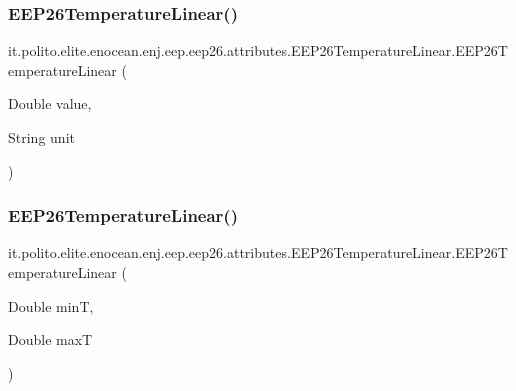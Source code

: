 \subsubsection{\texorpdfstring{E\+E\+P26\+Temperature\+Linear()}{EEP26TemperatureLinear()}\hspace{0.1cm}{\footnotesize\ttfamily [2/3]}}
{\footnotesize\ttfamily it.\+polito.\+elite.\+enocean.\+enj.\+eep.\+eep26.\+attributes.\+E\+E\+P26\+Temperature\+Linear.\+E\+E\+P26\+Temperature\+Linear (\begin{DoxyParamCaption}\item[{Double}]{value,  }\item[{String}]{unit }\end{DoxyParamCaption})}

\hypertarget{classit_1_1polito_1_1elite_1_1enocean_1_1enj_1_1eep_1_1eep26_1_1attributes_1_1_e_e_p26_temperature_linear_adf34ac904b3745354e5a1cd247f47696}{}\label{classit_1_1polito_1_1elite_1_1enocean_1_1enj_1_1eep_1_1eep26_1_1attributes_1_1_e_e_p26_temperature_linear_adf34ac904b3745354e5a1cd247f47696} 
\subsubsection{\texorpdfstring{E\+E\+P26\+Temperature\+Linear()}{EEP26TemperatureLinear()}\hspace{0.1cm}{\footnotesize\ttfamily [3/3]}}
{\footnotesize\ttfamily it.\+polito.\+elite.\+enocean.\+enj.\+eep.\+eep26.\+attributes.\+E\+E\+P26\+Temperature\+Linear.\+E\+E\+P26\+Temperature\+Linear (\begin{DoxyParamCaption}\item[{Double}]{minT,  }\item[{Double}]{maxT }\end{DoxyParamCaption})}



